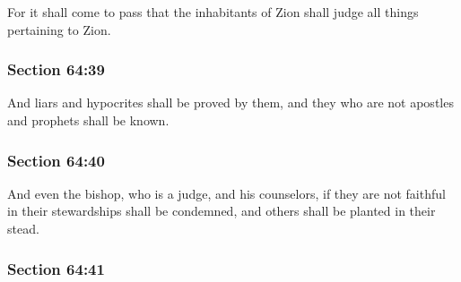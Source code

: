		For it shall come to pass that the inhabitants of Zion shall judge all things pertaining to Zion.


	\subsubsection{Section 64:39} %
		\label{DC64-39}

		And liars and hypocrites shall be proved by them, and they who are not apostles and prophets shall be known.


	\subsubsection{Section 64:40} %
		\label{DC64-40}

		And even the bishop, who is a judge, and his counselors, if they are not faithful in their stewardships shall be condemned, and others shall be planted in their stead.


	\subsubsection{Section 64:41} %
		\label{DC64-41}

